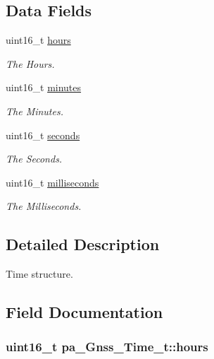 \subsection*{Data Fields}
\begin{DoxyCompactItemize}
\item 
uint16\+\_\+t \hyperlink{structpa___gnss___time__t_a28543d6c6a542e1704f2d0ab9c38fd7e}{hours}
\begin{DoxyCompactList}\small\item\em The Hours. \end{DoxyCompactList}\item 
uint16\+\_\+t \hyperlink{structpa___gnss___time__t_aa471c8d3b7d70143abf41396e9beda2e}{minutes}
\begin{DoxyCompactList}\small\item\em The Minutes. \end{DoxyCompactList}\item 
uint16\+\_\+t \hyperlink{structpa___gnss___time__t_ab72e58e36b2c6d227ed24c03937e1cfc}{seconds}
\begin{DoxyCompactList}\small\item\em The Seconds. \end{DoxyCompactList}\item 
uint16\+\_\+t \hyperlink{structpa___gnss___time__t_a9f329755804481b7516a8fc4048d47be}{milliseconds}
\begin{DoxyCompactList}\small\item\em The Milliseconds. \end{DoxyCompactList}\end{DoxyCompactItemize}


\subsection{Detailed Description}
Time structure. 

\subsection{Field Documentation}
\subsubsection[{\texorpdfstring{hours}{hours}}]{\setlength{\rightskip}{0pt plus 5cm}uint16\+\_\+t pa\+\_\+\+Gnss\+\_\+\+Time\+\_\+t\+::hours}\hypertarget{structpa___gnss___time__t_a28543d6c6a542e1704f2d0ab9c38fd7e}{}\label{structpa___gnss___time__t_a28543d6c6a542e1704f2d0ab9c38fd7e}


